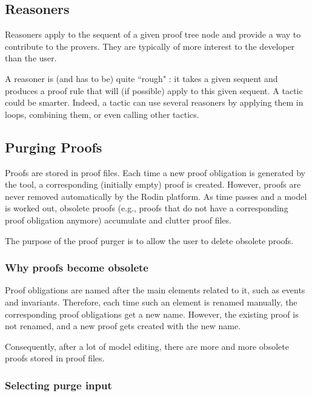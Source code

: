 \subsection{Reasoners}
\label{reasoners}

Reasoners apply to the sequent of a given proof tree node and provide a way to contribute to the provers.  They are typically of more interest to the developer than the user. 

A reasoner is (and has to be) quite ``rough" : it takes a given sequent and produces a proof rule that will (if possible) apply to this given sequent. A tactic could be smarter. Indeed, a tactic can use several reasoners by applying them in loops, combining them, or even calling other tactics.

\subsection{Purging Proofs}
\label{purging_proofs}

Proofs are stored in proof files. Each time a new proof obligation is generated by the tool, a corresponding (initially empty) proof is created. However, proofs are never removed automatically by the Rodin platform. As time passes and a model is worked out, obsolete proofs (e.g., proofs that do not have a corresponding proof obligation anymore) accumulate and clutter proof files.

The purpose of the proof purger is to allow the user to delete obsolete proofs. 

\subsubsection{Why proofs become obsolete}

Proof obligations are named after the main elements related to it, such as events and invariants. Therefore, each time such an element is renamed manually, the corresponding proof obligations get a new name. However, the existing proof is not renamed, and a new proof gets created with the new name.

Consequently, after a lot of model editing, there are more and more obsolete proofs stored in proof files.

\subsubsection{Selecting purge input}

